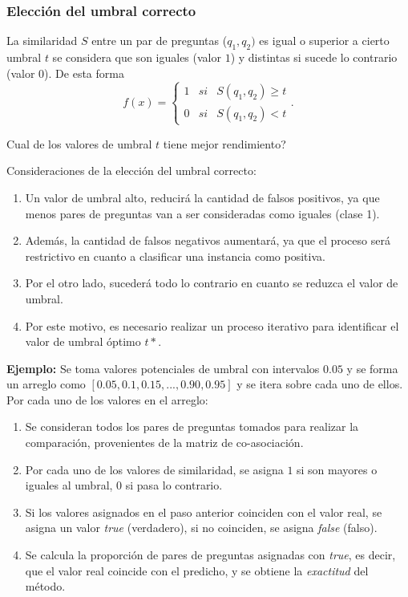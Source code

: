 \begin{frame}[allowframebreaks]
	\frametitle{Elección del umbral correcto}
	La similaridad \(S\) entre un par de preguntas (\(q_1,q_2)\) es igual o superior a cierto umbral \(t\) se considera que son iguales (valor \(1\)) y distintas si sucede lo contrario (valor \(0\)). De esta forma
	\[f(x) = \left\{ \begin{array}{lcc} 1 & si & S(q_1, q_2)\geq t
		\\ 0 & si & S(q_1, q_2) < t
	\end{array} \right..\]

	\begin{center}
		\centering	Cual de los valores de umbral \(t\) tiene mejor rendimiento?
	\end{center}

	\framebreak

	Consideraciones de la elección del umbral correcto:
	\bigskip
	\begin{enumerate}[<*>]
		\item Un valor de umbral alto, reducirá la cantidad de falsos positivos, ya que menos pares de preguntas van a ser consideradas como iguales (clase 1).
		\item Además, la cantidad de falsos negativos aumentará, ya que el proceso será restrictivo en cuanto a clasificar una instancia como positiva.
		\item Por el otro lado, sucederá todo lo contrario en cuanto se reduzca el valor de umbral.
		\item Por este motivo, es necesario realizar un proceso iterativo para identificar el valor de umbral óptimo \(t*\).
	\end{enumerate}

	\framebreak

	\textbf{Ejemplo:} Se toma valores potenciales de umbral con intervalos \(0.05\) y se forma un arreglo como \textbf{\([0.05, 0.1, 0.15, ..., 0.90, 0.95]\)} y se itera sobre cada uno de ellos. Por cada uno de los valores en el arreglo:
	\bigskip
	\begin{enumerate}[<*>]
		\item Se consideran todos los pares de preguntas tomados para realizar la comparación, provenientes de la matriz de co-asociación.
		\item Por cada uno de los valores de similaridad, se asigna \(1\) si son mayores o iguales al umbral, \(0\) si pasa lo contrario.
		\item Si los valores asignados en el paso anterior coinciden con el valor real, se asigna un valor \textit{true} (verdadero), si no coinciden, se asigna \textit{false} (falso).
		\item Se calcula la proporción de pares de preguntas asignadas con \textit{true}, es decir, que el valor real coincide con el predicho, y se obtiene la \textit{exactitud} del método.
	\end{enumerate}


\end{frame}
